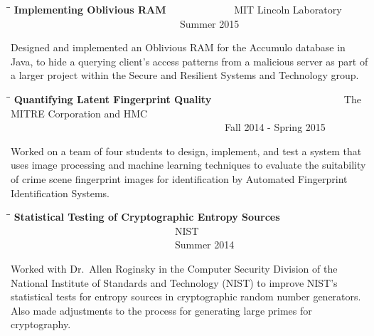\documentclass{res}
\begin{document}
\begin{resume}
   \begin{tabbing}
   \hspace{3in}\=  \hspace{1.63in}\= \kill %
    {\bf Implementing Oblivious RAM} \>~~~~~~~~~~~~~MIT Lincoln Laboratory \>~~~~~~~~~~~~~~~~~~~~~~~~~~~~~~~~~~Summer 2015\\                       
   \end{tabbing}\vspace{-30pt}      %
    Designed and implemented an Oblivious RAM for the Accumulo database in Java, to hide a querying client's access patterns from a malicious server as part of a larger project within the Secure and Resilient Systems and Technology group.

   \begin{tabbing}
   \hspace{2in}\=  \hspace{1.63in}\= \kill %
    {\bf Quantifying Latent Fingerprint Quality} \>~~~~~~~~~~~~~~~~~~~~~~~~~~The MITRE Corporation
    and HMC  \>~~~~~~~~~~~~~~~~~~~~~~~~~~~~~~~~~~~~~~~~~~~Fall 2014 - Spring 2015\\                       
   \end{tabbing}\vspace{-30pt}      %
    Worked on a team of four students to design, implement, and test a system that uses image processing and machine learning techniques to evaluate the suitability of crime scene fingerprint images for identification by Automated Fingerprint Identification Systems.

	\begin{tabbing}
	\hspace{3in}\=  \hspace{1.63in}\= \kill %
	{\bf Statistical Testing of Cryptographic Entropy Sources} \>~~~~~~~~~~~~~~~~~~~~~~~~~~~~~~~~~NIST 
 \>~~~~~~~~~~~~~~~~~~~~~~~~~~~~~~~~~Summer 2014\\      
	\end{tabbing} \vspace{-30pt}
	Worked with Dr.~Allen Roginsky in the Computer Security Division of the National Institute of Standards and Technology (NIST) to improve NIST's statistical tests for entropy sources in cryptographic random number generators.  Also made adjustments to the process for generating large primes for cryptography.
\\








\end{resume}
\end{document}
